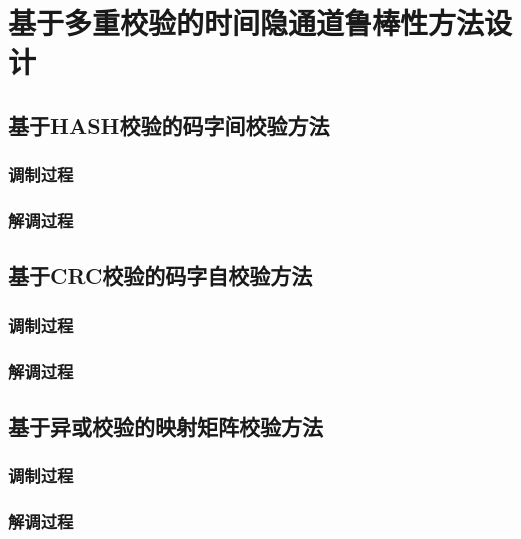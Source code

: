 \section{基于多重校验的时间隐通道鲁棒性方法设计}
\label{chap:hash:robustness}

\subsection{基于HASH校验的码字间校验方法}
\label{chap:hash:robustness:hash}

\subsubsection{调制过程}
\label{chap:hash:robustness:hash:modulation}

\subsubsection{解调过程}
\label{chap:hash:robustness:hash:demodulation}

\subsection{基于CRC校验的码字自校验方法}
\label{chap:hash:robustness:crc}

\subsubsection{调制过程}
\label{chap:hash:robustness:crc:modulation}

\subsubsection{解调过程}
\label{chap:hash:robustness:crc:demodulation}

\subsection{基于异或校验的映射矩阵校验方法}
\label{chap:hash:robustness:xor}

\subsubsection{调制过程}
\label{chap:hash:robustness:xor:modulation}

\subsubsection{解调过程}
\label{chap:hash:robustness:xor:demodulation}
